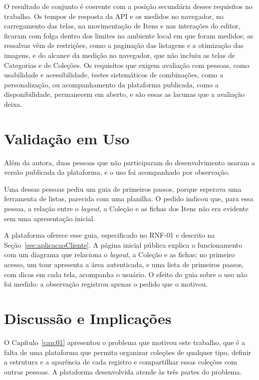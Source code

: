 O resultado de conjunto é coerente com a posição secundária desses requisitos no trabalho. Os tempos de resposta da API e os medidos no navegador, no carregamento das telas, na movimentação de Itens e nas interações do editor, ficaram com folga dentro dos limites no ambiente local em que foram medidos; as ressalvas vêm de restrições, como a paginação das listagens e a otimização das imagens, e do alcance da medição no navegador, que não incluiu as telas de Categorias e de Coleções. Os requisitos que exigem avaliação com pessoas, como usabilidade e acessibilidade, testes sistemáticos de combinações, como a personalização, ou acompanhamento da plataforma publicada, como a disponibilidade, permanecem em aberto, e são essas as lacunas que a avaliação deixa.

\section{Validação em Uso}
\label{sec:validacaoUso}

Além da autora, duas pessoas que não participaram do desenvolvimento usaram a versão publicada da plataforma, e o uso foi acompanhado por observação.

Uma dessas pessoas pediu um guia de primeiros passos, porque esperava uma ferramenta de listas, parecida com uma planilha. O pedido indicou que, para essa pessoa,
a relação entre o \textit{layout}, a Coleção e as fichas dos Itens não era evidente sem uma apresentação inicial.

A plataforma oferece esse guia, especificado no RNF-01 e descrito na Seção~\ref{sec:aplicacaoCliente}. A página inicial pública explica o funcionamento
com um diagrama que relaciona o \textit{layout}, a Coleção e as fichas; no primeiro acesso, um tour apresenta a área autenticada, e uma lista de primeiros
passos, com dicas em cada tela, acompanha o usuário. O efeito do guia sobre o uso não foi medido: a observação registrou apenas o pedido que o motivou.

\section{Discussão e Implicações}
\label{sec:discussao}

O Capítulo~\ref{cap:01} apresentou o problema que motivou este trabalho, que é a falta de uma plataforma que permita organizar coleções de qualquer tipo,
definir a estrutura e a aparência de cada registro e compartilhar essas coleções com outras pessoas. A plataforma desenvolvida atende às três partes do problema.

